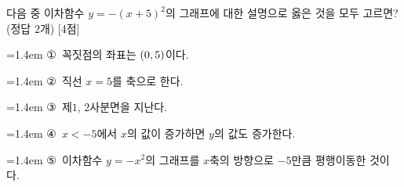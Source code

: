 다음 중 이차함수 $y=-(x+5)^2$의 그래프에 대한 설명으로 옳은 것을 모두 고르면? (정답 $2$개) \mbox{[4점]}
\par\medskip\par\noindent\hangindent=1.4em {\small ①}\ 꼭짓점의 좌표는 $(0{,}\mkern3mu 5)$이다.\par\noindent\hangindent=1.4em {\small ②}\ 직선 $x=5$를 축으로 한다.\par\noindent\hangindent=1.4em {\small ③}\ 제$1$, $2$사분면을 지난다.\par\noindent\hangindent=1.4em {\small ④}\ $x<-5$에서 $x$의 값이 증가하면 $y$의 값도 증가한다.\par\noindent\hangindent=1.4em {\small ⑤}\ 이차함수 $y=-x^2$의 그래프를 $x$축의 방향으로 $-5$만큼 평행이동한 것이다.\par\medskip
